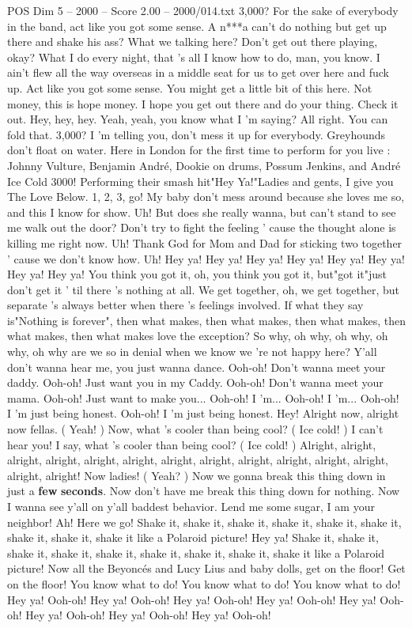 \begin{textsample}{POS Dim 5 – 2000 – Score 2.00 – 2000/014.txt}  \label{ex:f5_pos_002}
3,000?
For the sake of everybody in the band, act like you got some sense.
A n***a can't do nothing but get up there and shake his ass?
What we talking here?
Don't get out there playing, okay?
What I do every night, that 's all I know how to do, man, you know.
I ain't flew all the way overseas in a middle seat for us to get over here and fuck up.
Act like you got some sense.
You might get a little bit of this here.
Not money, this is hope money.
I hope you get out there and do your thing.
Check it out.
Hey, hey, hey.
Yeah, yeah, you know what I 'm saying?
All right.
You can fold that. 3,000?
I 'm telling you, don't mess it up for everybody.
Greyhounds don't float on water.
Here in London for the first time to perform for you live : Johnny Vulture, Benjamin André, Dookie on drums, Possum Jenkins, and André Ice Cold 3000!
Performing their smash hit"Hey Ya!"Ladies and gents, I give you The Love Below. 1, 2, 3, go!
My baby don't mess around because she loves me so, and this I know for show.
Uh!
But does she really wanna, but can't stand to see me walk out the door?
Don't try to fight the feeling ' cause the thought alone is killing me right now.
Uh!
Thank God for Mom and Dad for sticking two together ' cause we don't know how.
Uh!
Hey ya!
Hey ya!
Hey ya!
Hey ya!
Hey ya!
Hey ya!
Hey ya!
Hey ya!
You think you got it, oh, you think you got it, but"got it"just don't get it ' til there 's nothing at all.
We get together, oh, we get together, but separate 's always better when there 's feelings involved.
If what they say is"Nothing is forever", then what makes, then what makes, then what makes, then what makes, then what makes love the exception?
So why, oh why, oh why, oh why, oh why are we so in denial when we know we 're not happy here?
Y'all don't wanna hear me, you just wanna dance.
Ooh-oh!
Don't wanna meet your daddy.
Ooh-oh!
Just want you in my Caddy.
Ooh-oh!
Don't wanna meet your mama.
Ooh-oh!
Just want to make you...
Ooh-oh!
I 'm...
Ooh-oh!
I 'm...
Ooh-oh!
I 'm just being honest.
Ooh-oh!
I 'm just being honest.
Hey!
Alright now, alright now fellas. ( Yeah! ) Now, what 's cooler than being cool? ( Ice cold! ) I can't hear you!
I say, what 's cooler than being cool? ( Ice cold! ) Alright, alright, alright, alright, alright, alright, alright, alright, alright, alright, alright, alright, alright, alright!
Now ladies! ( Yeah? ) Now we gonna break this thing down in just a \textbf{few} \textbf{seconds}.
Now don't have me break this thing down for nothing.
Now I wanna see y'all on y'all baddest behavior.
Lend me some sugar, I am your neighbor!
Ah!
Here we go!
Shake it, shake it, shake it, shake it, shake it, shake it, shake it, shake it, shake it like a Polaroid picture!
Hey ya!
Shake it, shake it, shake it, shake it, shake it, shake it, shake it, shake it, shake it like a Polaroid picture!
Now all the Beyoncés and Lucy Lius and baby dolls, get on the floor!
Get on the floor!
You know what to do!
You know what to do!
You know what to do!
Hey ya!
Ooh-oh!
Hey ya!
Ooh-oh!
Hey ya!
Ooh-oh!
Hey ya!
Ooh-oh!
Hey ya!
Ooh-oh!
Hey ya!
Ooh-oh!
Hey ya!
Ooh-oh!
Hey ya!
Ooh-oh!

\end{textsample}
